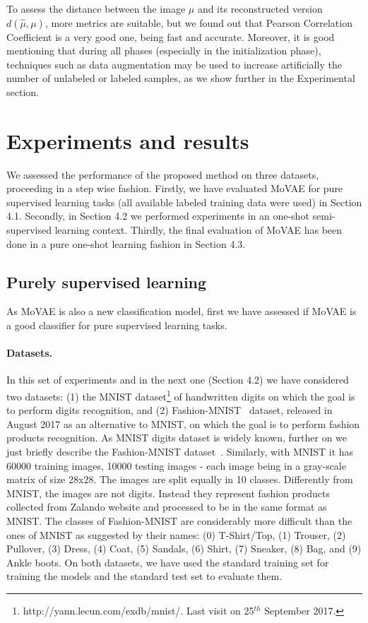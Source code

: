 \documentclass[sigconf,authorversion=true]{aamas}  %
\begin{document}
To assess the distance between the image $\mu$ and its reconstructed version $d(\hat{\mu},\mu)$, more metrics are suitable, but we found out that Pearson Correlation Coefficient is a very good one, being fast and accurate. Moreover, it is good mentioning that during all phases (especially in the initialization phase), techniques such as data augmentation may be used to increase artificially the number of unlabeled or labeled samples, as we show further in the Experimental section.

\section{Experiments and results}

We assessed the performance of the proposed method on three datasets, proceeding in a step wise fashion. Firstly, we have evaluated MoVAE for pure supervised learning tasks (all available labeled training data were used) in Section 4.1. Secondly,  in Section 4.2 we performed experiments in an one-shot semi-supervised learning context. Thirdly, the final evaluation of MoVAE has been done in a pure one-shot learning fashion in Section 4.3.

\subsection{Purely supervised learning}

As MoVAE is also a new classification model, first we have assessed if MoVAE is a good classifier for pure supervised learning tasks.

\paragraph{Datasets.} In this set of experiments and in the next one (Section 4.2) we have considered two datasets: (1) the MNIST dataset\footnote{http://yann.lecun.com/exdb/mnist/. Last visit on 25$^{th}$ September 2017.} of handwritten digits on which the goal is to perform digits recognition, and (2) Fashion-MNIST~\cite{xiao2017FashionMNIST} dataset, released in August 2017 as an alternative to MNIST, on which the goal is to perform fashion products recognition. As MNIST digits dataset is widely known, further on we just briefly describe the Fashion-MNIST dataset~\cite{xiao2017FashionMNIST}. Similarly, with MNIST it has 60000 training images, 10000 testing images - each image being in a gray-scale matrix of size 28x28. The images are  split equally in 10 classes. Differently from MNIST, the images are not digits. Instead they represent fashion products collected from Zalando website and processed to be in the same format as MNIST. The classes of Fashion-MNIST are considerably more difficult than the ones of MNIST as suggested by their names: (0) T-Shirt/Top, (1) Trouser, (2) Pullover, (3) Dress, (4) Coat, (5) Sandals, (6) Shirt, (7) Sneaker, (8) Bag, and (9) Ankle boots. On both datasets, we have used the standard training set for training the models and the standard test set to evaluate them.
\end{document}
